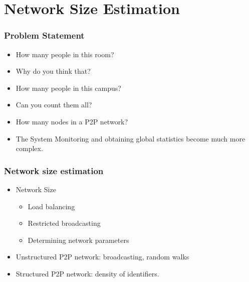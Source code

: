 \documentclass[red]{beamer}
\begin{document}
\section{Network Size Estimation}

\begin{frame}
\frametitle{Problem Statement}
\begin{itemize}
\item How many people in this room?
\item Why do you think that?
\singlespacing
\item How many people in this campus?
\item Can you count them all?
\singlespacing
\item How many nodes in a P2P network?
\item The System Monitoring and obtaining global statistics
become much more complex.
\end{itemize}
\end{frame}

\begin{frame}
\frametitle{Network size estimation}
\begin{itemize}
\item Network Size
\begin{itemize}
\item Load balancing
\item Restricted broadcasting 
\item Determining network parameters
\end{itemize}
\item Unstructured P2P network: broadcasting, random walks
\item Structured P2P network: density of identifiers.
\end{itemize}
\end{frame}

\end{document}
